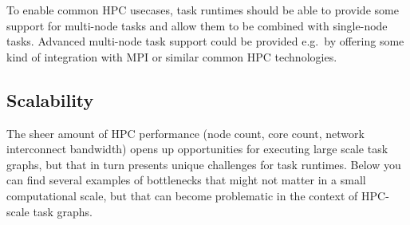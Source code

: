 To enable common HPC usecases, task runtimes should be able to provide some support
for multi-node tasks and allow them to be combined with single-node tasks. Advanced multi-node
task support could be provided e.g.\ by offering some kind of integration with MPI or similar
common HPC technologies.

\subsection{Scalability}
The sheer amount of HPC performance (node count, core count, network interconnect bandwidth)
opens up opportunities for executing large scale task graphs, but that in turn presents
unique challenges for task runtimes. Below you can find several examples of bottlenecks that
might not matter in a small computational scale, but that can become problematic in the context of
HPC-scale task graphs.

